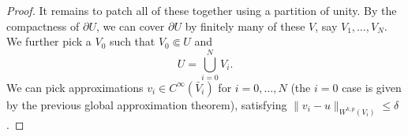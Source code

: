 \documentclass[a4paper]{article}
\begin{document}
\begin{proof}
  It remains to patch all of these together using a partition of unity. By the compactness of $\partial U$, we can cover $\partial U$ by finitely many of these $V$, say $V_1, \ldots, V_N$. We further pick a $V_0$ such that $V_0 \Subset U$ and
  \[
    U = \bigcup_{i = 0}^N V_i.
  \]
  We can pick approximations $v_i \in C^\infty(\bar{V}_i)$ for $i = 0, \ldots, N$ (the $i = 0$ case is given by the previous global approximation theorem), satisfying $\|v_i - u\|_{W^{k, p}(V_i)} \leq \delta$.
%
%
%
%
%
%

\end{proof}
\end{document}
